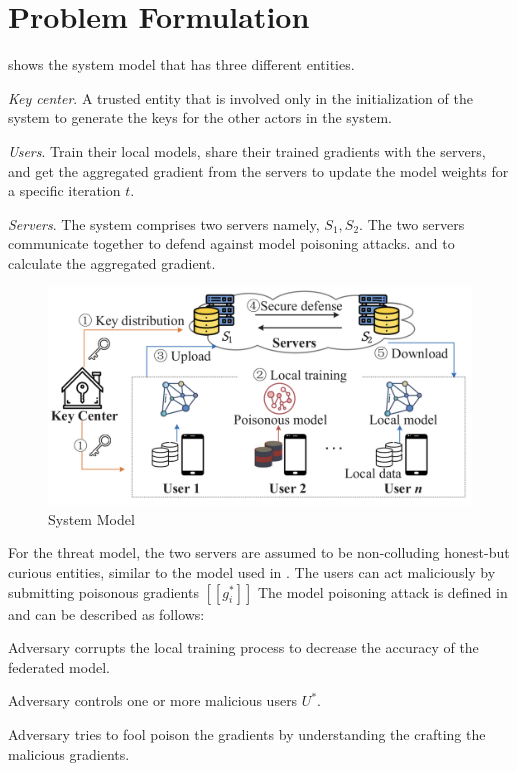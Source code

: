 \section{Problem Formulation}
\label{sec:problem-formulation}

 shows the system model that has three different entities.
\begin{enumerate*}[label=(\roman*)]
\item \emph{Key center}.
A trusted entity that is involved only in the initialization of the system to generate the keys for the other actors in the system.
\item \emph{Users}.
Train their local models, share their trained gradients with the servers, and get the aggregated gradient from the servers to update the model weights for a specific iteration $t$.
\item \emph{Servers}.
The system comprises two servers namely, $S_1, S_2$.
The two servers communicate together to defend against model poisoning attacks. and to calculate the aggregated gradient.
\end{enumerate*}

\begin{figure}[htb]
\centering
  \includegraphics[width=0.8\linewidth]{resources/system-model.pdf}
  \caption{System Model}
  \label{fig:system-model}
\end{figure}

For the threat model, the two servers are assumed to be non-colluding honest-but curious entities, similar to the model used in \cite{mohassel2017secureml}.
The users can act maliciously by submitting poisonous gradients $[[g_i^*]]$
The model poisoning attack is defined in \cite{fang2020local} and can be described as follows:
\begin{enumerate*}
    \item Adversary corrupts the local training process to decrease the accuracy of the federated model.
    \item Adversary controls one or more malicious users $U^*$.
    \item Adversary tries to fool poison the gradients by understanding the crafting the malicious gradients.
\end{enumerate*}

